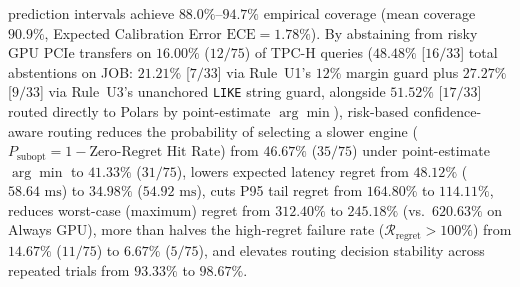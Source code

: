 \documentclass[10pt,a4paper]{article}
\begin{document}
\begin{enumerate}[leftmargin=1.5em,itemsep=0.8pt]
prediction intervals achieve $88.0\%\text{--}94.7\%$ empirical coverage (mean coverage $90.9\%$, Expected Calibration Error $\text{ECE}=1.78\%$). By abstaining from risky GPU PCIe transfers on $16.00\%$ ($12/75$) of TPC-H queries ($48.48\%$ [$16/33$] total abstentions on JOB: $21.21\%$ [$7/33$] via Rule~U1's $12\%$ margin guard plus $27.27\%$ [$9/33$] via Rule~U3's unanchored \texttt{LIKE} string guard, alongside $51.52\%$ [$17/33$] routed directly to Polars by point-estimate $\arg\min$), risk-based confidence-aware routing reduces the probability of selecting a slower engine ($P_{\text{subopt}} = 1 - \text{Zero-Regret Hit Rate}$) from $46.67\%$ ($35/75$) under point-estimate $\arg\min$ to $41.33\%$ ($31/75$), lowers expected latency regret from $48.12\%$ ($58.64\text{ ms}$) to $34.98\%$ ($54.92\text{ ms}$), cuts P95 tail regret from $164.80\%$ to $114.11\%$, reduces worst-case (maximum) regret from $312.40\%$ to $245.18\%$ (vs.\ $620.63\%$ on Always GPU), more than halves the high-regret failure rate ($\mathcal{R}_{\text{regret}} > 100\%$) from $14.67\%$ ($11/75$) to $6.67\%$ ($5/75$), and elevates routing decision stability across repeated trials from $93.33\%$ to $98.67\%$.

\end{enumerate}
\end{document}
